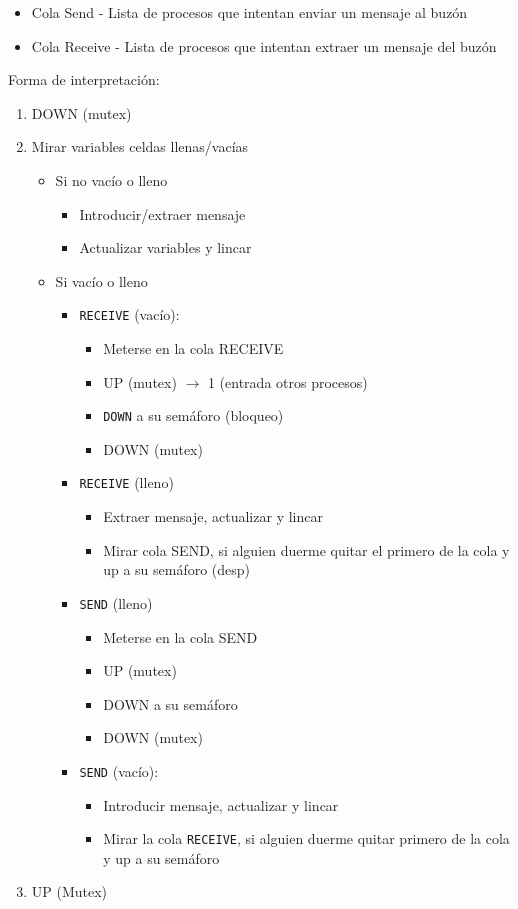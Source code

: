 \documentclass[10pt,portrait, twocolumn]{article}
\begin{document}
	\begin{itemize}
	\item Cola Send - Lista de procesos que intentan enviar un mensaje al buzón
	\item Cola Receive - Lista de procesos que intentan extraer un mensaje del buzón
	\end{itemize}
	
Forma de interpretación:

	\begin{enumerate}
		\item DOWN (mutex)
		\item Mirar variables celdas llenas/vacías
			\begin{itemize}
			\item Si no vacío o lleno
				\begin{itemize}
				\item Introducir/extraer mensaje
				\item Actualizar variables y lincar
				\end{itemize}
			\item Si vacío o lleno
				\begin{itemize}
				\item \texttt{RECEIVE} (vacío):
					\begin{itemize}
					\item Meterse en la cola RECEIVE
					\item UP (mutex) $\rightarrow$ 1 (entrada otros procesos)
					\item \texttt{DOWN} a su semáforo (bloqueo)
					\item DOWN (mutex)
					\end{itemize}
				\item \texttt{RECEIVE} (lleno)
					\begin{itemize}
					\item Extraer mensaje, actualizar y lincar
					\item Mirar cola SEND, si alguien duerme quitar el primero de la cola y up a su semáforo (desp)
					\end{itemize}
				\item \texttt{SEND} (lleno)
					\begin{itemize}
					\item Meterse en la cola SEND
					\item UP (mutex)
					\item DOWN a su semáforo
					\item DOWN (mutex)
					\end{itemize}
				\item \texttt{SEND} (vacío):
					\begin{itemize}
					\item Introducir mensaje, actualizar y lincar
					\item Mirar la cola \texttt{RECEIVE}, si alguien duerme quitar primero de la cola y up a su semáforo
					\end{itemize}
				\end{itemize}
			\end{itemize}
		\item UP (Mutex)
	\end{enumerate}
	
\end{document}
